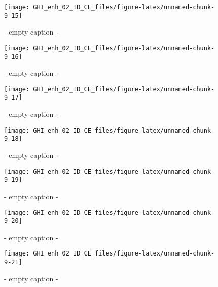 \documentclass[
  10pt,
  a4paper,oneside]{article}
\begin{document}
\begin{figure}[H]

{\centering \texttt{[image: GHI\_enh\_02\_ID\_CE\_files/figure-latex/unnamed-chunk-9-15]} 

}

\caption{ - empty caption - }\label{fig:unnamed-chunk-9-15}
\end{figure}
\begin{figure}[H]

{\centering \texttt{[image: GHI\_enh\_02\_ID\_CE\_files/figure-latex/unnamed-chunk-9-16]} 

}

\caption{ - empty caption - }\label{fig:unnamed-chunk-9-16}
\end{figure}
\begin{figure}[H]

{\centering \texttt{[image: GHI\_enh\_02\_ID\_CE\_files/figure-latex/unnamed-chunk-9-17]} 

}

\caption{ - empty caption - }\label{fig:unnamed-chunk-9-17}
\end{figure}
\begin{figure}[H]

{\centering \texttt{[image: GHI\_enh\_02\_ID\_CE\_files/figure-latex/unnamed-chunk-9-18]} 

}

\caption{ - empty caption - }\label{fig:unnamed-chunk-9-18}
\end{figure}
\begin{figure}[H]

{\centering \texttt{[image: GHI\_enh\_02\_ID\_CE\_files/figure-latex/unnamed-chunk-9-19]} 

}

\caption{ - empty caption - }\label{fig:unnamed-chunk-9-19}
\end{figure}
\begin{figure}[H]

{\centering \texttt{[image: GHI\_enh\_02\_ID\_CE\_files/figure-latex/unnamed-chunk-9-20]} 

}

\caption{ - empty caption - }\label{fig:unnamed-chunk-9-20}
\end{figure}
\begin{figure}[H]

{\centering \texttt{[image: GHI\_enh\_02\_ID\_CE\_files/figure-latex/unnamed-chunk-9-21]} 

}

\caption{ - empty caption - }\label{fig:unnamed-chunk-9-21}
\end{figure}
\end{document}
